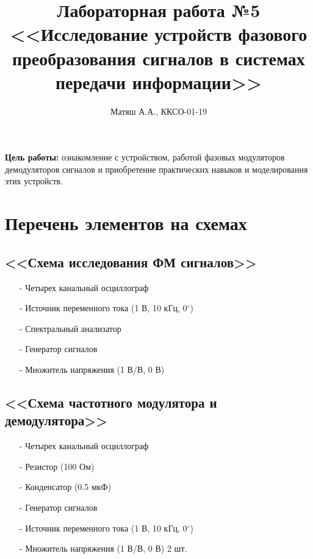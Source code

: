 \documentclass[11pt]{article}
\title{\textbf{Лабораторная работа №5\\
<<Исследование устройств фазового преобразования сигналов в системах передачи информации>>}}
\author{Матяш А.А., ККСО-01-19}
\date{}
\begin{document}
\maketitle
\thispagestyle{empty}
\textbf{Цель работы:} ознакомление с устройством, работой фазовых модуляторов демодуляторов сигналов и приобретение практических навыков и моделирования этих устройств. 
\section{Перечень элементов на схемах}
\subsection{<<Схема исследования ФМ сигналов>>}
\begin{itemize}
    \item[-] Четырех канальный осциллограф
    \item[-] Источник переменного тока (1 В, 10 кГц, 0$^{\circ}$)
    \item[-] Спектральный анализатор
    \item[-] Генератор сигналов
    \item[-] Множитель напряжения (1 В/В, 0 В)
\end{itemize}
\subsection{<<Схема частотного модулятора и демодулятора>>}
\begin{itemize}
    \item[-] Четырех канальный осциллограф
    \item[-] Резистор (100 Ом)
    \item[-] Конденсатор (0.5 мкФ)
    \item[-] Генератор сигналов
    \item[-] Источник переменного тока (1 В, 10 кГц, 0$^{\circ}$)
    \item[-] Множитель напряжения (1 В/В, 0 В) 2 шт.
\end{itemize}
\end{document}
